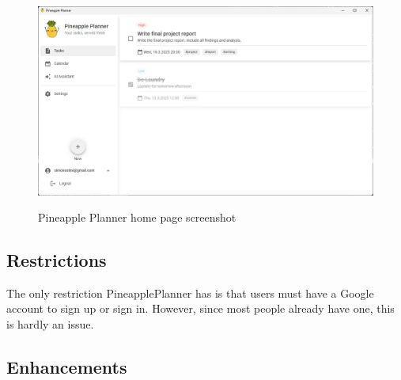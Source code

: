\documentclass{article}
\begin{document}
\begin{figure}[H]
  \centering
  \includegraphics[width=1\textwidth]{images/pineapple_planner_screenshot_home.png}
  \label{Infrastructure proposal}
  \caption{Pineapple Planner home page screenshot}
\end{figure}

\subsection{Restrictions}
The only restriction PineapplePlanner has is that users must have a Google account to sign up or sign in. However, since most people already have one, this is hardly an issue.
\subsection{Enhancements}
\end{document}
